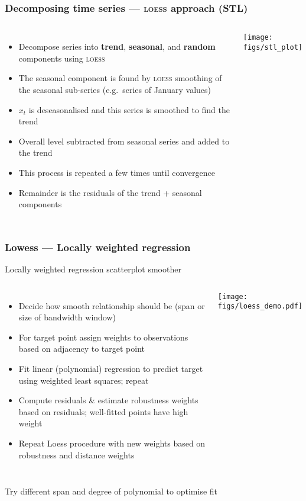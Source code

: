 \documentclass{beamer}
\begin{document}
\begin{frame}
\frametitle{Decomposing time series --- \textsc{loess} approach (STL)}
\begin{columns}
    \column{7cm}
    \begin{itemize}
        \item Decompose series into \textbf{trend}, \textbf{seasonal}, and \textbf{random} components using \textsc{loess}
        \item The seasonal component is found by \textsc{loess} smoothing of the seasonal sub-series (e.g.~series of January values)
        \item $x_t$ is deseasonalised and this series is smoothed to find the trend
        \item Overall level subtracted from seasonal series and added to the trend
        \item This process is repeated a few times until convergence
        \item Remainder is the residuals of the trend + seasonal components
    \end{itemize}
    \column{5cm}
    \texttt{[image: figs/stl\_plot]}
\end{columns}
\normalsize
\end{frame}

\begin{frame}
    \frametitle{Lowess --- Locally weighted regression}
    Locally weighted regression scatterplot smoother
    \begin{columns}
        \column{7cm}
        \small
        \begin{itemize}
            \item Decide how smooth relationship should be (\alert{span} or size of bandwidth window)
            \item For target point assign weights to observations based on adjacency to target point
            \item Fit linear (polynomial) regression to predict target using weighted least squares; repeat
            \item Compute residuals \& estimate robustness weights based on residuals; well-fitted points have high weight
            \item Repeat Loess procedure with new weights based on robustness and distance weights
        \end{itemize}
        \normalsize
        \column{5cm}
        \texttt{[image: figs/loess\_demo.pdf]}
    \end{columns}
    \medskip 
    Try different span and degree of polynomial to optimise fit
\end{frame}
\end{document}

